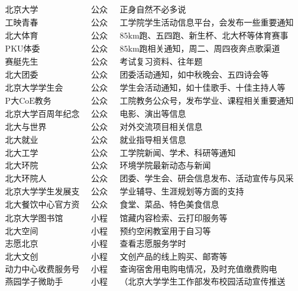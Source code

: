 \documentclass[11pt,oneside]{book}
\begin{document}
\[
\begin{matrix}
    \text{北京大学} & \text{公众号} & \text{正身自然不必多说}\\
    \text{工映青春} & \text{公众号} & \text{工学院学生活动信息平台，会发布一些重要通知}\\
    \text{北大体育} & \text{公众号} & \text{85km跑、五四跑、新生杯、北大杯等体育赛事通知}\\
    \text{PKU体委} & \text{公众号} & \text{85km跑相关通知，周二、周四夜奔点歌渠道}\\
    \text{赛艇先生} & \text{公众号} & \text{考试复习资料、往年题}\\
    \text{北大团委} & \text{公众号} & \text{团委活动通知，如中秋晚会、五四诗会等}\\
    \text{北京大学学生会} & \text{公众号} & \text{学生会活动通知，如十佳歌手、十佳主持人等}\\
    \text{P大CoE教务} & \text{公众号} & \text{工院教务公众号，发布学业、课程相关重要通知}\\
    \text{北京大学百周年纪念讲堂} & \text{公众号} & \text{电影、演出等信息}\\
    \text{北大与世界} & \text{公众号} & \text{对外交流项目相关信息}\\
    \text{北大就业} & \text{公众号} & \text{就业指导相关信息}\\
    \text{北大工学} & \text{公众号} & \text{工学院新闻、学术、科研等通知}\\
    \text{北大环院} & \text{公众号} & \text{环境学院最新动态与新闻}\\
    \text{北大环院人} & \text{公众号} & \text{团委、学生会、研会信息发布、活动宣传与风采展示平台}\\
    \text{北京大学学生发展支持} & \text{公众号} & \text{学业辅导、生涯规划等方面的支持}\\
    \text{北大餐饮中心官方资讯} & \text{公众号} & \text{食堂、菜品、特色美食信息}\\
    \text{北京大学图书馆} & \text{小程序} & \text{馆藏内容检索、云打印服务等}\\
    \text{北大空间} & \text{小程序} & \text{预约空闲教室用于自习等}\\
    \text{志愿北京} & \text{小程序} & \text{查看志愿服务学时}\\
    \text{北大文创} & \text{小程序} & \text{文创产品的线上购买、邮寄等}\\
    \text{动力中心收费服务号} & \text{小程序} & \text{查询宿舍用电购电情况，及时充值缴费购电}\\
    \text{燕园学子微助手} & \text{小程序} & \text{（北京大学学生工作部发布校园活动宣传推送}\\
\end{matrix}
\]
\end{document}
